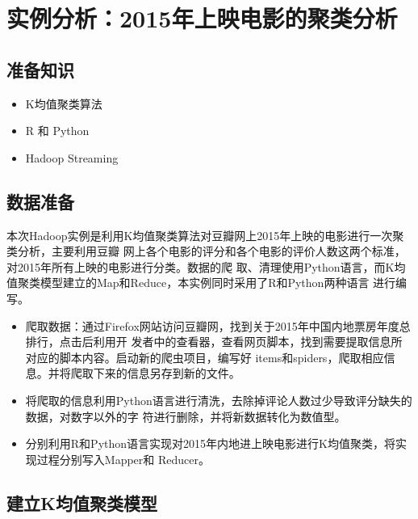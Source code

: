 \section{实例分析：2015年上映电影的聚类分析}\label{ux5b9eux4f8bux5206ux67902015ux5e74ux4e0aux6620ux7535ux5f71ux7684ux805aux7c7bux5206ux6790}

\subsection{准备知识}\label{ux51c6ux5907ux77e5ux8bc6}

\begin{itemize}
\itemsep1pt\parskip0pt
\item
  K均值聚类算法
\item
  R 和 Python
\item
  Hadoop Streaming
\end{itemize}

\subsection{数据准备}\label{ux6570ux636eux51c6ux5907}

本次Hadoop实例是利用K均值聚类算法对豆瓣网上2015年上映的电影进行一次聚类分析，主要利用豆瓣
网上各个电影的评分和各个电影的评价人数这两个标准，对2015年所有上映的电影进行分类。数据的爬
取、清理使用Python语言，而K均值聚类模型建立的Map和Reduce，本实例同时采用了R和Python两种语言
进行编写。

\begin{itemize}
\item
  爬取数据：通过Firefox网站访问豆瓣网，找到关于2015年中国内地票房年度总排行，点击后利用开
  发者中的查看器，查看网页脚本，找到需要提取信息所对应的脚本内容。启动新的爬虫项目，编写好
  items和spiders，爬取相应信息。并将爬取下来的信息另存到新的文件。
\item
  将爬取的信息利用Python语言进行清洗，去除掉评论人数过少导致评分缺失的数据，对数字以外的字
  符进行删除，并将新数据转化为数值型。
\item
  分别利用R和Python语言实现对2015年内地进上映电影进行K均值聚类，将实现过程分别写入Mapper和
  Reducer。
\end{itemize}

\subsection{建立K均值聚类模型}\label{ux5efaux7acbkux5747ux503cux805aux7c7bux6a21ux578b}


